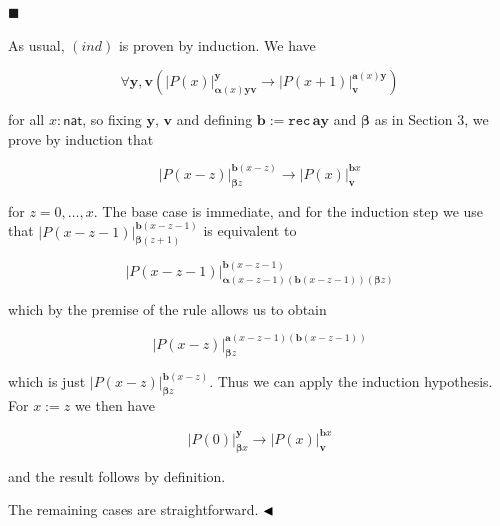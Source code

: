 \documentclass[10pt,a4paper]{article}
\begin{document}
 
 
\par\noindent  $\blacksquare$ 
 
As usual, $(ind)$ is proven by induction. We have\par
  
\par  \quad  \[\forall\bm{y},\bm{v}\left(|{P(x)}|^{\bm{y}}_{\bm{\alpha}(x)\bm{y}\bm{v}}\to|{P(x+1)}|^{\bm{a}(x)\bm{y}}_{\bm{v}}\right)\]\quad  \quad  
  
for all $x:\mathsf{nat}$, so fixing $\bm{y}$, $\bm{v}$ and defining $\bm{b}:=\mathtt{rec}\,\bm{a}\bm{y}$ and $\bm{\beta}$ as in Section 3, we prove by induction that\par
  
\par  \quad  \[|{P(x-z)}|^{\bm{b}(x-z)}_{\bm{\beta}z}\to|{P(x)}|^{\bm{b}x}_{\bm{v}}\]\quad  \quad  
  
for $z=0,\ldots,x$. The base case is immediate, and for the induction step we use that $|{P(x-z-1)}|^{\bm{b}(x-z-1)}_{\bm{\beta}(z+1)}$ is equivalent to\par
  
\par  \quad  \[|{P(x-z-1)}|^{\bm{b}(x-z-1)}_{\bm{\alpha}(x-z-1)(\bm{b}(x-z-1))(\bm{\beta}z)}\]\quad  \quad  
  
which by the premise of the rule allows us to obtain\par
  
\par  \quad  \[|{P(x-z)}|^{\bm{a}(x-z-1)(\bm{b}(x-z-1))}_{\bm{\beta}z}\]\quad  \quad  
  
which is just $|{P(x-z)}|^{\bm{b}(x-z)}_{\bm{\beta}z}$. Thus we can apply the induction hypothesis. For $x:=z$ we then have\par
  
\par  \quad  \[|{P(0)}|^{\bm{y}}_{\bm{\beta}x}\to|{P(x)}|^{\bm{b}x}_{\bm{v}}\]\quad  \quad  
  
and the result follows by definition.\par
 
 
  
The remaining cases are straightforward. $\hfill\blacktriangleleft$\par
 
 
 
\end{document}
